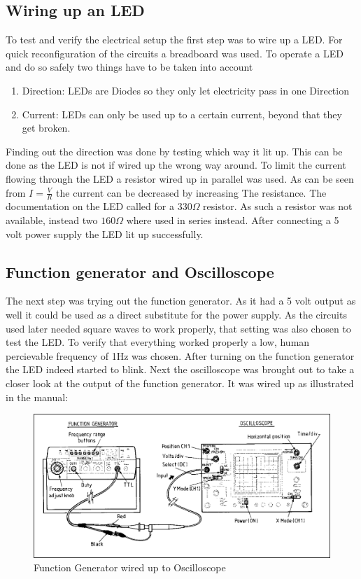 \documentclass[fleqn,11pt]{article}
\begin{document}
\subsection{Wiring up an LED}
To test and verify the electrical setup the first step was to wire up a LED. For quick reconfiguration of
the circuits a breadboard was used. To operate a LED and do so safely two things have to be taken into account
\begin{enumerate}
\item Direction: LEDs are Diodes so they only let electricity pass in one Direction
\item Current: LEDs can only be used up to a certain current, beyond that they get broken.
\end{enumerate}
Finding out the direction was done by testing which way it lit up. This can be done as the LED is not
if wired up the wrong way around. To limit the current flowing through the LED a resistor wired up in
parallel was used. As can be seen from $I = \frac{V}{R}$ the current can be decreased by increasing The
resistance. The documentation on the LED called for a $330\Omega$ resistor. As such a resistor was not
available, instead two $160\Omega$ where used in series instead. After connecting a 5 volt power supply
the LED lit up successfully.

\subsection {Function generator and Oscilloscope}
The next step was trying out the function generator. As it had a 5 volt output as well it could be used as
a direct substitute for the power supply. As the circuits used later needed square waves to work properly,
that setting was also chosen to test the LED. To verify that everything worked properly a low, human
percievable frequency of 1Hz was chosen. After turning on the function generator the LED indeed started
to blink.
\newline
\newline
Next the oscilloscope was brought out to take a closer look at the output of the function generator. It
was wired up as illustrated in the manual:
\begin{figure}[h]
\includegraphics[width=16cm]{images/Oscilloscope.png}
\caption{Function Generator wired up to Oscilloscope}
\label{fig:figure1}
\end{figure}
\end{document}
